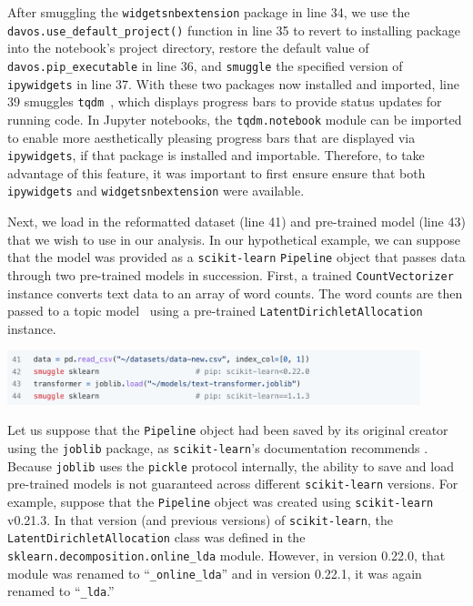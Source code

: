 \documentclass[preprint,12pt,a4paper]{elsarticle}
\begin{document}
After smuggling the \texttt{widgetsnbextension} package in line 34, we use the \texttt{davos.use\_\-default\_\-project()} function in line 35 to revert to installing package into the notebook's project directory, restore the default value of \texttt{davos.pip\_executable} in line 36, and \texttt{smuggle} the specified version of \texttt{ipywidgets} in line 37.
With these two packages now installed
and imported, line 39 smuggles \texttt{tqdm}~\cite{daCoEtal22}, which
displays progress bars to provide status updates for running code. In
Jupyter notebooks, the \texttt{tqdm.notebook} module can be imported
to enable more aesthetically pleasing progress bars that are displayed via
\texttt{ipywidgets}, if that package is installed and
importable. Therefore, to take advantage of this feature, it was
important to first ensure ensure that both \texttt{ipywidgets} and \texttt{widgetsnbextension} were available.

Next, we load in the reformatted dataset (line 41) and pre-trained
model (line 43) that we wish to use in our analysis. In our
hypothetical example, we can suppose that the model was provided as a
\texttt{scikit-learn} \texttt{Pipeline} object that passes data
through two pre-trained models in succession. First, a trained \texttt{CountVectorizer}
instance converts text data to an array of word counts.  The
word counts are then passed to a topic model~\cite{BleiEtal03} using a
pre-trained \texttt{LatentDirichletAllocation} instance.
\begin{center}
\includegraphics[width=0.9\textwidth]{figs/example8}
\end{center}
Let us suppose that the \texttt{Pipeline} object had been saved by its
original creator using the \texttt{joblib} package, as
\texttt{scikit-learn}'s documentation recommends \cite{skle22}. Because
\texttt{joblib} uses the \texttt{pickle} protocol internally, the
ability to save and load pre-trained models is not guaranteed across
different \texttt{scikit-learn} versions. For example, suppose that
the \texttt{Pipeline} object was created using \texttt{scikit-learn}
v0.21.3. In that version (and previous versions) of \texttt{scikit-learn}, the
\texttt{LatentDirichletAllocation} class was defined in
the \texttt{sklearn.de\-comp\-o\-si\-tion.online\_lda} module. However, in version
0.22.0, that module was renamed to ``\texttt{\_online\_lda}'' and in
version 0.22.1, it was again renamed to ``\texttt{\_lda}.''
\end{document}

